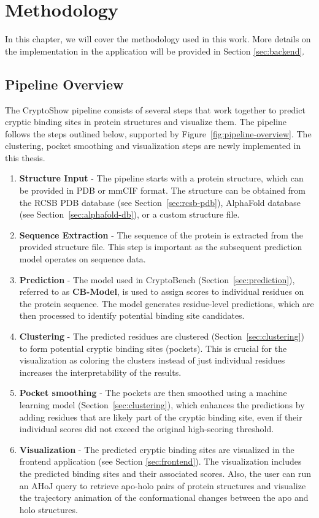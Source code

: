 \chapter{Methodology}
\label{chap:methodology}

In this chapter, we will cover the methodology used in this work. More details on the implementation in the application will be provided in Section \ref{sec:backend}.

\section{Pipeline Overview}
\label{sec:pipeline-overview}

The CryptoShow pipeline consists of several steps that work together to predict cryptic binding sites in protein structures and visualize them. The pipeline follows the steps outlined below, supported by Figure~\ref{fig:pipeline-overview}. The clustering, pocket smoothing and visualization steps are newly implemented in this thesis.

\begin{enumerate}
    \item \textbf{Structure Input} - The pipeline starts with a protein structure, which can be provided in PDB or mmCIF format. The structure can be obtained from the RCSB PDB database (see Section~\ref{sec:rcsb-pdb}), AlphaFold database (see Section~\ref{sec:alphafold-db}), or a custom structure file.
    \item \textbf{Sequence Extraction} - The sequence of the protein is extracted from the provided structure file. This step is important as the subsequent prediction model operates on sequence data.
    \item \textbf{Prediction} - The model used in CryptoBench (Section~\ref{sec:prediction}), referred to as \textbf{CB-Model}, is used to assign scores to individual residues on the protein sequence. The model generates residue-level predictions, which are then processed to identify potential binding site candidates.
    \item \textbf{Clustering} - The predicted residues are clustered (Section~\ref{sec:clustering}) to form potential cryptic binding sites (pockets). This is crucial for the visualization as coloring the clusters instead of just individual residues increases the interpretability of the results.
    \item \textbf{Pocket smoothing} - The pockets are then smoothed using a machine learning model (Section~\ref{sec:clustering}), which enhances the predictions by adding residues that are likely part of the cryptic binding site, even if their individual scores did not exceed the original high-scoring threshold.
    \item \textbf{Visualization} - The predicted cryptic binding sites are visualized in the frontend application (see Section \ref{sec:frontend}). The visualization includes the predicted binding sites and their associated scores. Also, the user can run an AHoJ query to retrieve apo-holo pairs of protein structures and visualize the trajectory animation of the conformational changes between the apo and holo structures.
\end{enumerate}

